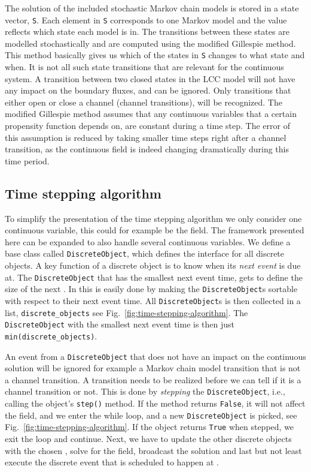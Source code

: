 The solution of the included stochastic Markov chain models is stored in a state vector, \texttt{S}. Each element in \texttt{S} corresponds to one Markov model and the value reflects which state each model is in. The transitions between these states are modelled stochastically and are computed using the modified Gillespie method. This method basically gives us which of the states in \texttt{S} changes to what state and when. It is not all such state transitions that are relevant for the continuous system. A transition between two closed states in the LCC model will not have any impact on the boundary fluxes, and can be ignored. Only transitions that either open or close a channel (channel transitions), will be recognized. The modified Gillespie method assumes that any continuous variables that a certain propensity function depends on, are constant during a time step. The error of this assumption is reduced by taking smaller time steps right after a channel transition, as the continuous field is indeed changing dramatically during this time period. \par

\subsection*{Time stepping algorithm}
\label{sec:event-driven-simulator}
To simplify the presentation of the time stepping algorithm we only consider one continuous variable, this could for example be the \Ca field. The framework presented here can be expanded to also handle several continuous variables. We define a base class called \texttt{DiscreteObject}, which defines the interface for all discrete objects. A key function of a discrete object is to know when its \textit{next event} is due at. The \texttt{DiscreteObject} that has the smallest next event time, gets to define the size of the next \Dt. In  this is easily done by making the \texttt{DiscreteObject}s sortable with respect to their next event time. All \texttt{DiscreteObject}s is then collected in a list, \texttt{discrete\_objects} see Fig.~\ref{fig:time-stepping-algorithm}. The \texttt{DiscreteObject} with the smallest next event time is then just \texttt{min(discrete\_objects)}.\par

An event from a \texttt{DiscreteObject} that does not have an impact on the continuous solution will be ignored for example a Markov chain model transition that is not a channel transition. A transition needs to be realized before we can tell if it is a channel transition or not. This is done by \textit{stepping} the \texttt{DiscreteObject}, i.e., calling the object's \texttt{step()} method. If the method returns \texttt{False}, it will not affect the \Ca field, and we enter the while loop, and a new \texttt{DiscreteObject} is picked, see Fig.~\ref{fig:time-stepping-algorithm}. If the object returns \texttt{True} when stepped, we exit the loop and continue. Next, we have to update the other discrete objects with the chosen \Dt, solve for the \Ca field, broadcast the solution and last but not least execute the discrete event that is scheduled to happen at \Dt.\par

